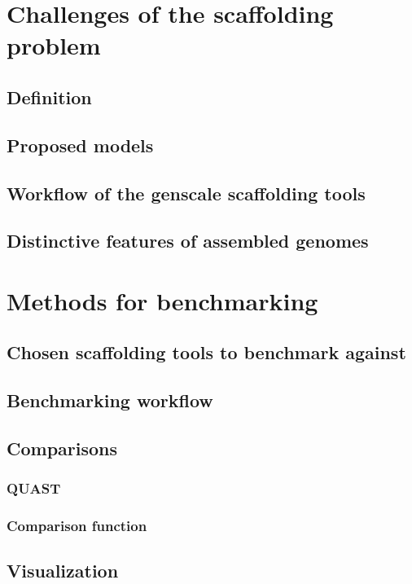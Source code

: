 \documentclass[12pt]{report}
\begin{document}
\chapter{Challenges of the scaffolding problem}
\section{Definition}
\section{Proposed models}
\section{Workflow of the genscale scaffolding tools}
\section{Distinctive features of assembled genomes}
\chapter{Methods for benchmarking}
\section{Chosen scaffolding tools to benchmark against}
\section{Benchmarking workflow}
\section{Comparisons}
\subsection{QUAST}
\subsection{Comparison function}
\section{Visualization}
\end{document}
